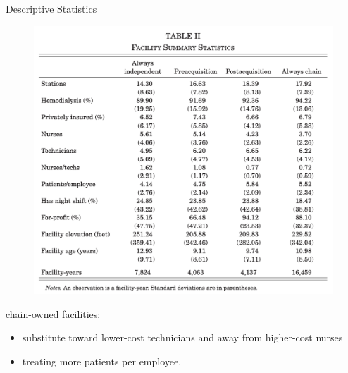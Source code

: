 \begin{frame}{Descriptive Statistics}
    \begin{figure}
        \centering
        \includegraphics[width=0.5\linewidth]{tb2.png}
    \end{figure}
    chain-owned facilities:
    \begin{itemize}
        \item substitute toward lower-cost technicians and away from higher-cost nurses
        \item treating more patients per employee.
    \end{itemize}
\end{frame}